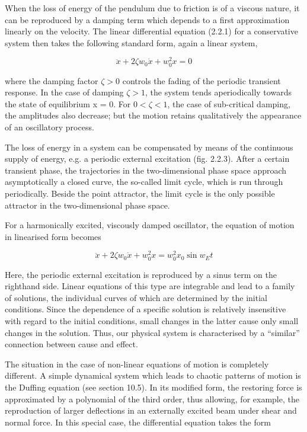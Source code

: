\documentclass[12pt]{article}
\begin{document}
\hfill

When the loss of energy of the pendulum due to friction is of a viscous nature,
it can be reproduced by a damping term which depends to a first approximation
linearly on the velocity. The linear differential equation (2.2.1) for a conservative
system then takes the following standard form, again a linear system,

\[
\ddot{x} + 2 \zeta w_0 \dot{x} + w^2_0x = 0
\]


where the damping factor $\zeta > 0$ controls the fading of the periodic transient response.
In the case of damping $\zeta  > 1$, the system tends aperiodically towards the
state of equilibrium x = 0. For $0 < \zeta < 1$, the case of sub-critical damping, the
amplitudes also decrease; but the motion retains qualitatively the appearance of an
oscillatory process.

\hfill

The loss of energy in a system can be compensated by means of the continuous supply
of energy, e.g. a periodic external excitation (fig. 2.2.3). After a certain transient
phase, the trajectories in the two-dimensional phase space approach asymptotically
a closed curve, the so-called limit cycle, which is run through periodically. Beside the
point attractor, the limit cycle is the only possible attractor in the two-dimensional
phase space.

\hfill

For a harmonically excited, viscously damped oscillator, the equation of motion in
linearised form becomes

\[
\ddot{x} + 2 \zeta w_0 \dot{x} + w_0^2 x = w_0^2 x_0 \sin w_E t
\]


Here, the periodic external excitation is reproduced by a sinus term on the righthand
side. Linear equations of this type are integrable and lead to a family of
solutions, the individual curves of which are determined by the initial conditions.
Since the dependence of a specific solution is relatively insensitive with regard to
the initial conditions, small changes in the latter cause only small changes in the
solution. Thus, our physical system is characterised by a “similar” connection between
cause and effect.

\hfill

The situation in the case of non-linear equations of motion is completely different.
A simple dynamical system which leads to chaotic patterns of motion is the Duffing
equation (see section 10.5). In its modified form, the restoring force is approximated
by a polynomial of the third order, thus allowing, for example, the reproduction of
larger deflections in an externally excited beam under shear and normal force. In
this special case, the differential equation takes the form
\end{document}
